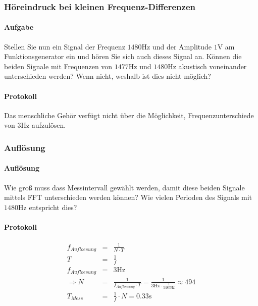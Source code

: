 \documentclass[10pt]{scrreprt}
\begin{document}
        \subsubsection{Höreindruck bei kleinen Frequenz-Differenzen}
        \paragraph{Aufgabe}
        Stellen Sie nun ein Signal der Frequenz $1480\si{\hertz}$ und der Amplitude $1\si{\volt}$ am Funktionsgenerator
        ein und hören Sie sich auch dieses Signal an. Können die beiden
        Signale mit Frequenzen von $1477\si{\hertz}$ und $1480\si{\hertz}$ akustisch voneinander unterschieden
        werden? Wenn nicht, weshalb ist dies nicht möglich?
        \paragraph{Protokoll}

        Das menschliche Gehör verfügt nicht über die Möglichkeit, Frequenzunterschiede
        von $3 \si{\hertz}$ aufzulösen.

        \subsubsection{Auflösung}
        \paragraph{Auflösung}
        Wie groß muss dass Messintervall gewählt werden, damit diese beiden Signale
        mittels FFT unterschieden werden können? Wie vielen Perioden des Signals mit
        $1480\si{\hertz}$ entspricht dies?
        \paragraph{Protokoll}

        \begin{eqnarray*}
            f_{Aufloesung} &=& \frac{1}{N \cdot T}\\
            T &=& \frac{1}{f}\\
            f_{Aufloesung} &=& 3 \si{\hertz}\\
            \Rightarrow N &=& \frac{1}{f_{Aufloesung} \cdot T} = \frac{1}{3 \si{\hertz} \cdot \frac{1}{1480\si{\hertz}}} \approx 494\\
            T_{Mess} &=& \frac{1}{f} \cdot N = 0.33 \si{\second}
        \end{eqnarray*}
\end{document}

